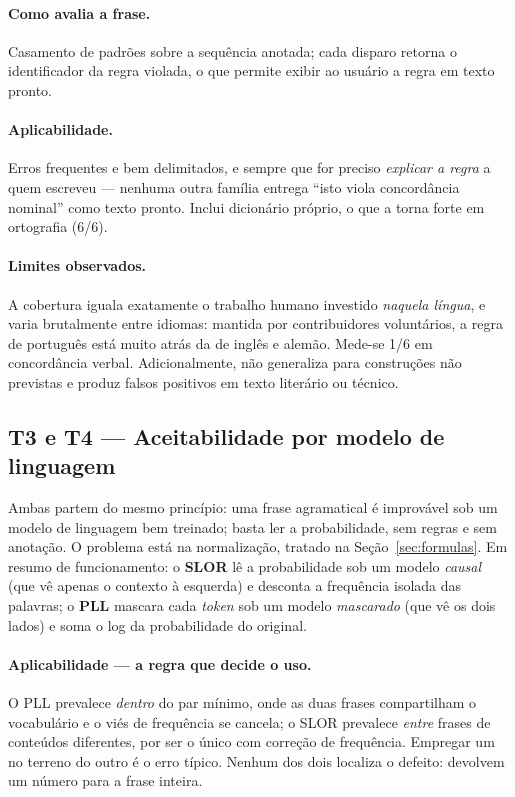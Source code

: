 \documentclass[11pt,a4paper]{article}
\begin{document}
\paragraph{Como avalia a frase.} Casamento de padrões sobre a sequência anotada; cada disparo
retorna o identificador da regra violada, o que permite exibir ao usuário a regra em texto pronto.

\paragraph{Aplicabilidade.} Erros frequentes e bem delimitados, e sempre que for preciso
\emph{explicar a regra} a quem escreveu --- nenhuma outra família entrega ``isto viola concordância
nominal'' como texto pronto. Inclui dicionário próprio, o que a torna forte em ortografia (6/6).

\paragraph{Limites observados.} A cobertura iguala exatamente o trabalho humano investido
\emph{naquela língua}, e varia brutalmente entre idiomas: mantida por contribuidores voluntários, a
regra de português está muito atrás da de inglês e alemão. Mede-se 1/6 em concordância verbal.
Adicionalmente, não generaliza para construções não previstas e produz falsos positivos em texto
literário ou técnico.

\subsection{T3 e T4 --- Aceitabilidade por modelo de linguagem}

Ambas partem do mesmo princípio: uma frase agramatical é improvável sob um modelo de linguagem bem
treinado; basta ler a probabilidade, sem regras e sem anotação. O problema está na normalização,
tratado na Seção~\ref{sec:formulas}. Em resumo de funcionamento: o \textbf{SLOR} lê a probabilidade
sob um modelo \emph{causal} (que vê apenas o contexto à esquerda) e desconta a frequência isolada
das palavras; o \textbf{PLL} mascara cada \textit{token} sob um modelo \emph{mascarado} (que vê os
dois lados) e soma o log da probabilidade do original.

\paragraph{Aplicabilidade --- a regra que decide o uso.} O PLL prevalece \emph{dentro} do par
mínimo, onde as duas frases compartilham o vocabulário e o viés de frequência se cancela; o SLOR
prevalece \emph{entre} frases de conteúdos diferentes, por ser o único com correção de frequência.
Empregar um no terreno do outro é o erro típico. Nenhum dos dois localiza o defeito: devolvem um
número para a frase inteira.
\end{document}
